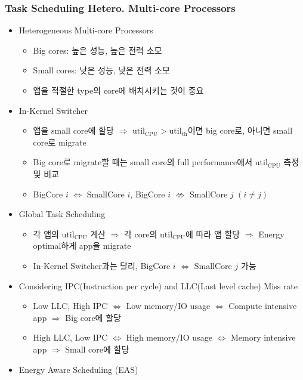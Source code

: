 \subsubsection*{Task Scheduling Hetero. Multi-core Processors}
\begin{itemize}
    \item Heterogeneous Multi-core Processors
    \begin{itemize}
        \item Big cores: 높은 성능, 높은 전력 소모
        \item Small cores: 낮은 성능, 낮은 전력 소모
        \item 앱을 적절한 type의 core에 배치시키는 것이 중요
    \end{itemize}
    \item In-Kernel Switcher
    \begin{itemize}
        \item 앱을 small core에 할당 $\Rightarrow$ $\mathrm{util_{CPU}}>\mathrm{util_{th}}$이면 big core로, 아니면 small core로 migrate
        \item Big core로 migrate할 때는 small core의 full performance에서 $\mathrm{util_{CPU}}$ 측정 및 비교
        \item BigCore $i$ $\Leftrightarrow$ SmallCore $i$, BigCore $i$ $\nLeftrightarrow$ SmallCore $j$ $(i \neq j)$
    \end{itemize}
    \item Global Task Scheduling
    \begin{itemize}
        \item 각 앱의 $\mathrm{util_{CPU}}$ 계산 $\Rightarrow$ 각 core의 $\mathrm{util_{CPU}}$에 따라 앱 할당 $\Rightarrow$ Energy optimal하게 app을 migrate
        \item In-Kernel Switcher과는 달리, BigCore $i$ $\Leftrightarrow$ SmallCore $j$ 가능
    \end{itemize}
    \item Considering IPC(Instruction per cycle) and LLC(Last level cache) Miss rate
    \begin{itemize}
        \item Low LLC, High IPC $\Leftrightarrow$ Low memory/IO usage $\Leftrightarrow$ Compute intensive app $\Rightarrow$ Big core에 할당
        \item High LLC, Low IPC $\Leftrightarrow$ High memory/IO usage $\Leftrightarrow$ Memory intensive app $\Rightarrow$ Small core에 할당
    \end{itemize}
    \item Energy Aware Scheduling (EAS)

\end{itemize}

